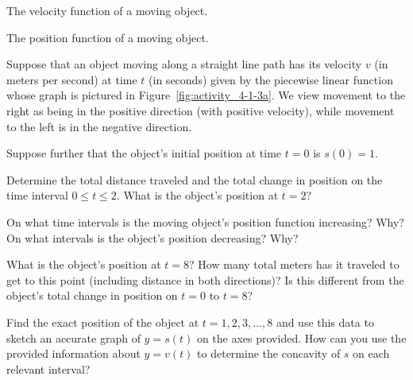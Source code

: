 
\begin{marginfigure}[6cm]
\caption{The velocity function of a moving object.} \label{fig:activity_4-1-3a}
\end{marginfigure}

\begin{marginfigure}[0cm]
\caption{The position function of a moving object.} \label{fig:activity_4-1-3b}
\end{marginfigure}

\begin{activity} \label{A:4.1.3}  Suppose that an object moving along a straight line path has its velocity $v$ (in meters per second) at time $t$ (in seconds) given by the piecewise linear function whose graph is pictured in Figure~\ref{fig:activity_4-1-3a}.  We view movement to the right as being in the positive direction (with positive velocity), while movement to the left is in the negative direction.

Suppose further that the object's initial position at time $t = 0$ is $s(0) = 1$.
\ba
\item Determine the total distance traveled and the total change in position on the time interval $0 \le t \le 2$.  What is the object's position at $t = 2$?

\item On what time intervals is the moving object's position function increasing?  Why?  On what intervals is the object's position decreasing?  Why?

\item What is the object's position at $t = 8$?  How many total meters has it traveled to get to this point (including distance in both directions)?  Is this different from the object's total change in position on $t = 0$ to $t = 8$?

\item Find the exact position of the object at $t = 1, 2, 3, \ldots, 8$ and use this data to sketch an accurate graph of $y = s(t)$ on the axes provided.  How can you use the provided information about $y = v(t)$ to determine the concavity of $s$ on each relevant interval?
\ea
\end{activity}

